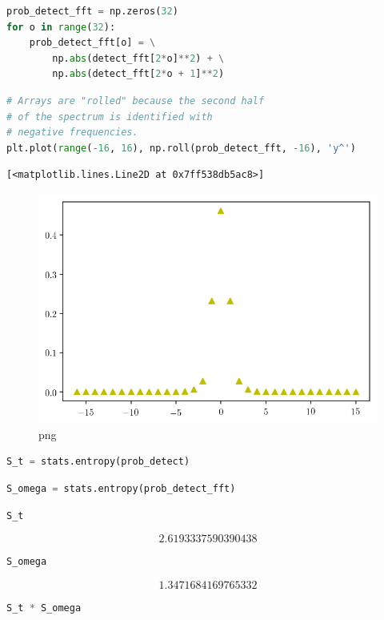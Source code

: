 \begin{lstlisting}[language=Python]
prob_detect_fft = np.zeros(32)
for o in range(32):
    prob_detect_fft[o] = \
        np.abs(detect_fft[2*o]**2) + \
        np.abs(detect_fft[2*o + 1]**2) 
\end{lstlisting}

\begin{lstlisting}[language=Python]
# Arrays are "rolled" because the second half 
# of the spectrum is identified with
# negative frequencies.
plt.plot(range(-16, 16), np.roll(prob_detect_fft, -16), 'y^')
\end{lstlisting}

\begin{lstlisting}
[<matplotlib.lines.Line2D at 0x7ff538db5ac8>]
\end{lstlisting}

\begin{figure}
\centering
\includegraphics[width=0.6\linewidth]{output_102_1.png}
\caption[]{png}
\end{figure}

\begin{lstlisting}[language=Python]
S_t = stats.entropy(prob_detect)
\end{lstlisting}

\begin{lstlisting}[language=Python]
S_omega = stats.entropy(prob_detect_fft)
\end{lstlisting}

\begin{lstlisting}[language=Python]
S_t
\end{lstlisting}

\[2.6193337590390438\]

\begin{lstlisting}[language=Python]
S_omega
\end{lstlisting}

\[1.3471684169765332\]

\begin{lstlisting}[language=Python]
S_t * S_omega
\end{lstlisting}

